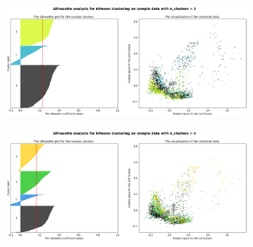 \documentclass[aspectratio=169,11pt,hyperref={colorlinks=true}]{beamer}
\begin{document}
\begin{frame}
\begin{columns}
    \begin{center}
     \begin{figure}
      \includegraphics[width=0.8\textwidth]{graphs/silhouette_multiclass_3.png}
      \end{figure}
      \begin{figure}
       \includegraphics[width=0.8\textwidth]{graphs/silhouette_multiclass_4.png}
       \end{figure}
    \end{center}
  \end{columns}
\end{frame}
\end{document}
